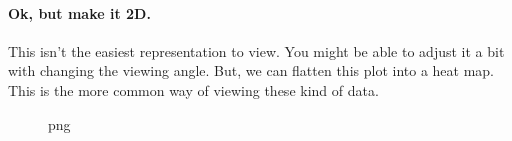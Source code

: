 \paragraph{Ok, but make it 2D.}\label{ok-but-make-it-2d.}

This isn't the easiest representation to view. You might be able to
adjust it a bit with changing the viewing angle. But, we can flatten
this plot into a heat map. This is the more common way of viewing these
kind of data.

\begin{Shaded}
\begin{Highlighting}[]
\OperatorTok{=}\NormalTok{(}\NormalTok{, }\NormalTok{))}
\OperatorTok{=}\OperatorTok{=}\OperatorTok{=}\NormalTok{[x.}\NormalTok{()], cmap}\OperatorTok{=}\NormalTok{)}
\OperatorTok{=}\NormalTok{)}
\NormalTok{)}
\NormalTok{)}
\NormalTok{)}

\end{Highlighting}
\end{Shaded}

\begin{figure}
\centering
{}
\caption{png}
\end{figure}

